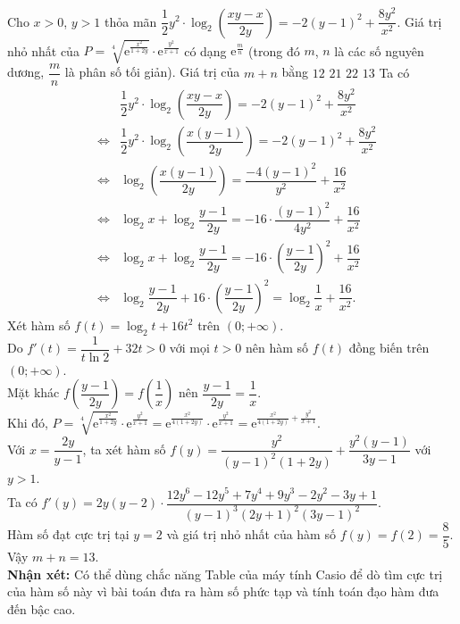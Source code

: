 \begin{ex}%
Cho $x>0$, $y>1$ thỏa mãn $\dfrac{1}{2}y^2\cdot\log_2\left(\dfrac{xy-x}{2y}\right)=-2(y-1)^2+\dfrac{8y^2}{x^2}$. Giá trị nhỏ nhất của $P=\sqrt[4]{\mathrm{e}^{\tfrac{x^2}{1+2y}}}\cdot \mathrm{e}^{\tfrac{y^2}{x+1}}$ có dạng $\mathrm{e}^{\tfrac{m}{n}}$ (trong đó $m$, $n$ là các số nguyên dương, $\dfrac{m}{n}$ là phân số tối giản). Giá trị của $m+n$ bằng
	\choice
	{\True $12$}
	{$21$}
	{$22$}
	{\True $13$}
	\loigiai
	{
		Ta có
		\allowdisplaybreaks
		\begin{eqnarray*}
		&&\dfrac{1}{2}y^2\cdot\log_2\left(\dfrac{xy-x}{2y}\right)=-2(y-1)^2+\dfrac{8y^2}{x^2}\\
		&\Leftrightarrow&\dfrac{1}{2}y^2\cdot\log_2\left(\dfrac{x(y-1)}{2y}\right)=-2(y-1)^2+\dfrac{8y^2}{x^2}\\
		&\Leftrightarrow&\log_2\left(\dfrac{x(y-1)}{2y}\right)=\dfrac{-4(y-1)^2}{y^2}+\dfrac{16}{x^2}\\
		&\Leftrightarrow&\log_2x+\log_2\dfrac{y-1}{2y}=-16\cdot \dfrac{(y-1)^2}{4y^2}+\dfrac{16}{x^2}\\
		&\Leftrightarrow&\log_2x+\log_2\dfrac{y-1}{2y}=-16\cdot \left(\dfrac{y-1}{2y}\right)^2+\dfrac{16}{x^2}\\
		&\Leftrightarrow&\log_2\dfrac{y-1}{2y}+16\cdot \left(\dfrac{y-1}{2y}\right)^2=\log_2\dfrac{1}{x}+\dfrac{16}{x^2}.
		\end{eqnarray*}
	Xét hàm số $f(t)=\log_2t+16t^2$ trên $(0;+\infty)$.\\
	Do $f'(t)=\dfrac{1}{t\ln 2}+32t>0$ với mọi $t>0$ nên hàm số $f(t)$ đồng biến trên $(0;+\infty)$.\\
	Mặt khác $f\left(\dfrac{y-1}{2y}\right)=f\left(\dfrac{1}{x}\right)$ nên $\dfrac{y-1}{2y}=\dfrac{1}{x}$.\\
	Khi đó, $P=\sqrt[4]{\mathrm{e}^{\tfrac{x^2}{1+2y}}}\cdot \mathrm{e}^{\tfrac{y^2}{x+1}}=\mathrm{e}^{\tfrac{x^2}{4(1+2y)}}\cdot \mathrm{e}^{\tfrac{y^2}{x+1}}=\mathrm{e}^{\tfrac{x^2}{4(1+2y)}+\tfrac{y^2}{x+1}}$.\\
	Với $x=\dfrac{2y}{y-1}$, ta xét hàm số $f(y)=\dfrac{y^2}{(y-1)^2(1+2y)}+\dfrac{y^2(y-1)}{3y-1}$ với $y>1$.\\
	Ta có $f'(y)=2y(y-2)\cdot\dfrac{12y^6-12y^5+7y^4+9y^3-2y^2-3y+1}{(y-1)^3(2y+1)^2(3y-1)^2}$.\\
	Hàm số đạt cực trị tại $y=2$ và giá trị nhỏ nhất của hàm số $f(y)=f(2)=\dfrac{8}{5}$.\\
	Vậy $m+n=13$.\\
	\textbf{Nhận xét:} Có thể dùng chắc năng Table của máy tính Casio để dò tìm cực trị của hàm số này vì bài toán đưa ra hàm số phức tạp và tính toán đạo hàm đưa đến bậc cao.
	}
\end{ex}
